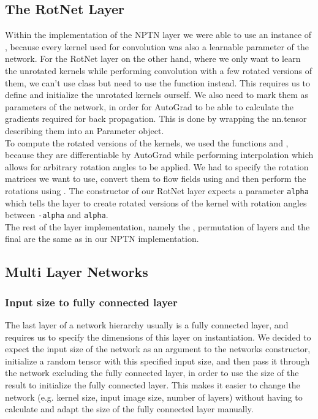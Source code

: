 \documentclass{llncs}
\begin{document}
\subsection{The RotNet Layer}
Within the implementation of the NPTN layer we were able to use an instance of \nnConvLayer, because every kernel used for convolution was also a learnable parameter of the network.
For the RotNet layer on the other hand, where we only want to learn the unrotated kernels while performing convolution with a few rotated versions of them, we can't use \nnConvLayer class but need to use the \nnConvFunction  function instead.
This requires us to define and initialize the unrotated kernels ourself. We also need to mark them as parameters of the network, in order for AutoGrad to be able to calculate the gradients required for back propagation. This is done by wrapping the nn.tensor describing them into an Parameter object.\\
To compute the rotated versions of the kernels, we used the functions \nnaffinegrid and \nngridsample, because they are differentiable by AutoGrad while performing interpolation which allows for arbitrary rotation angles to be applied. We had to specify the rotation matrices we want to use, convert them to flow fields using \nnaffinegrid and then perform the rotations using \nngridsample. The constructor of our RotNet layer expects a parameter \nolinkurl{alpha} which tells the layer to create rotated versions of the kernel with rotation angles between \nolinkurl{-alpha} and \nolinkurl{alpha}.\\
The rest of the layer implementation, namely the \nnMaxPool, permutation of layers and the final \nnAvgPool are the same as in our NPTN implementation.

\subsection{Multi Layer Networks}


\subsubsection{Input size to fully connected layer}
The last layer of a network hierarchy usually is a fully connected layer, and \pytorch requires us to specify the dimensions of this layer on instantiation. We decided to expect the input size of the network as an argument to the networks constructor, initialize a random tensor with this specified input size, and then pass it through the network excluding the fully connected layer, in order to use the size of the result to initialize the fully connected layer. This makes it easier to change the network (e.g. kernel size, input image size, number of layers) without having to calculate and adapt the size of the fully connected layer manually. 
\end{document}
